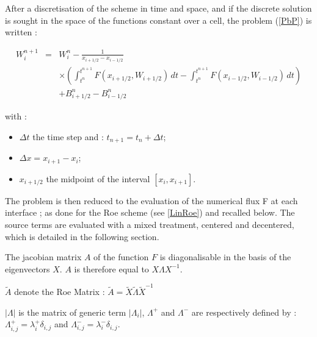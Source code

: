 \vspace{0.5cm}

After a discretisation of the scheme in time and space, and if the discrete solution is sought in the space of the functions constant over a cell, the problem (\ref{PbP}) is written :

\begin{eqnarray}
  W_{i}^{n+1} & = & W_{i}^{n} - \frac{1}{x_{i+1/2}-x_{i-1/2}} \nonumber \\
              &   & \times \left ( \int_{t^n}^{t^{n+1}} F(x_{i+1/2},W_{i+1/2})\, dt - \int_{t^n}^{t^{n+1}} F(x_{i-1/2},W_{i-1/2})\, dt  \right ) \nonumber \\
              &   & + B_{i+1/2}^n - B_{i-1/2}^n
\end{eqnarray}

with :
\begin{itemize}
  \item $\Delta t$ the time step and : $t_{n+1} = t_n + \Delta t$;
  \item $\Delta x = x_{i+1} - x_{i}$;
  \item $x_{i+1/2}$ the midpoint of the interval $[x_i , x_{i+1}]$.
\end{itemize}

\vspace{0.5cm}

The problem is then reduced to the evaluation of the numerical flux F at each interface ; as done for the Roe scheme (see \ref{LinRoe}) and recalled below. The source terms are evaluated with a mixed treatment, centered and decentered, which is detailed in the following section.

\vspace{0.5cm}

The jacobian matrix $A$ of the function $F$ is diagonalisable in the basis of the eigenvectors $X$. $A$ is therefore equal to $X \Lambda X^{-1}$.

\vspace{0.5cm}

$\tilde A$ denote the Roe Matrix : $\tilde A = \tilde X \tilde \Lambda \tilde{X}^{-1}$

\vspace{0.5cm}

$|\Lambda|$ is the matrix of generic term $|\Lambda_i|$, $\Lambda^+$ and $\Lambda^-$ are respectively defined by : $\Lambda_{i,j}^+ = \lambda_{i}^+ \delta_{i,j}$ and $\Lambda_{i,j}^- = \lambda_{i}^- \delta_{i,j}$.

\vspace{0.5cm}


